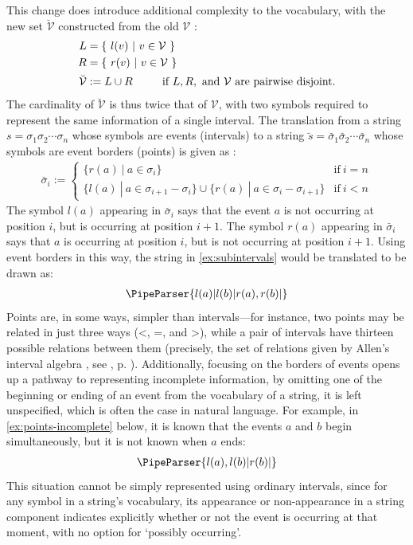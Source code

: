 \documentclass[a4paper,12pt,leqno]{article}
\newcommand{\vph}[1]{\vphantom{#1}}
\newcommand{\ebox}[1]{\fbox{$\vph{'(),}#1$}}
\newcommand{\V}{\mathcal{V}}
\newcommand{\EventString}[1]{%
	\renewcommand*{\do}[1]{\ebox{##1}}%
	\PipeParser{#1}%
}
\begin{document}
This change does introduce additional complexity to the vocabulary, with the new set $\breve{\V}$ constructed from the old $\V$ \cite[p. 37]{Fernando2018}:
\begin{align}
	L &= \{ ~l(v) ~|~ v \in \V~ \}\notag\\
	R &= \{ ~r(v) ~|~ v \in \V~ \}\notag\\
	\breve{\V} &:= L \cup R ~~~~~~~~\text{if } L, R, \text{ and } \V \text{ are pairwise disjoint.}
\end{align}
The cardinality of $\breve{\V}$ is thus twice that of $\V$, with two symbols required to represent the same information of a single interval. The translation from a string $s = \sigma_1\sigma_2\cdots\sigma_n$ whose symbols are events (intervals) to a string $\breve{s} = \breve{\sigma_1}\breve{\sigma_2}\cdots\breve{\sigma_n}$ whose symbols are event borders (points) is given as \cite[p. 38]{Fernando2018}:
\begin{align}
	\breve{\sigma_i} := \begin{cases}
		\{ r(a) ~|~ a \in \sigma_i \} & \text{if}~ i = n\\
		\{ l(a) ~|~ a \in \sigma_{i+1} - \sigma_i \} \cup \{ r(a) ~|~ a \in \sigma_{i} - \sigma_{i+1} \} & \text{if}~ i < n
	\end{cases}
\end{align}
The symbol $l(a)$ appearing in $\breve{\sigma_i}$ says that the event $a$ is not occurring at position $i$, but is occurring at position $i+1$. The symbol $r(a)$ appearing in $\breve{\sigma_i}$ says that $a$ is occurring at position $i$, but is not occurring at position $i+1$. Using event borders in this way, the string in \cref{ex:subintervals} would be translated to be drawn as:
\begin{align}
	\EventString{l(a)|l(b)|r(a),r(b)|{}}
\end{align}
Points are, in some ways, simpler than intervals---for instance, two points may be related in just three ways (\textless, =, and \textgreater), while a pair of intervals have thirteen possible relations between them (precisely, the set of relations given by Allen's interval algebra \citep{allen1983maintaining}, see , p. \pageref{tab:allen-rels-strings}). Additionally, focusing on the borders of events opens up a pathway to representing incomplete information, by omitting one of the beginning or ending of an event from the vocabulary of a string, it is left unspecified, which is often the case in natural language. For example, in \cref{ex:points-incomplete} below, it is known that the events $a$ and $b$ begin simultaneously, but it is not known when $a$ ends:
\begin{align}\label{ex:points-incomplete}
	\EventString{l(a),l(b)|r(b)|{}}
\end{align}
This situation cannot be simply represented using ordinary intervals, since for any symbol in a string's vocabulary, its appearance or non-appearance in a string component indicates explicitly whether or not the event is occurring at that moment, with no option for `possibly occurring'.
\end{document}
